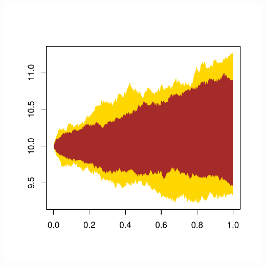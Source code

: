 \documentclass[10pt]{article}\usepackage[]{graphicx}\usepackage[]{color}
\makeatletter
\def\maxwidth{ %
  \ifdim\Gin@nat@width>\linewidth
    \linewidth
  \else
    \Gin@nat@width
  \fi
}
\newenvironment{knitrout}{}{} %
\makeatother
\begin{document}
\begin{knitrout}
{\centering \includegraphics[width=\maxwidth]{figure/unnamed-chunk-1} 

}



\end{knitrout}
\end{document}
